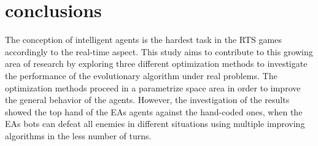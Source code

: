 \documentclass[]{interact}
\theoremstyle{plain}%
\theoremstyle{definition}
\theoremstyle{remark}
\begin{document}
\section{conclusions}
The conception of intelligent agents is the hardest task in the RTS games accordingly to the real-time aspect. This study aims to contribute to this growing area of research by exploring three different optimization methods to investigate the performance of the evolutionary algorithm under real problems. The optimization methods proceed in a parametrize space area in order to improve the general behavior of the agents. However, the investigation of the results showed the top hand of the EAs agents against the hand-coded ones, when the EAs bots can defeat all enemies in different situations using multiple improving algorithms in the less number of turns.





\end{document}
